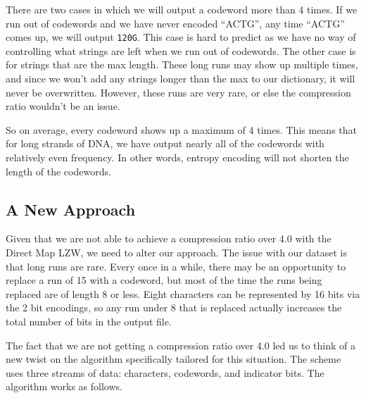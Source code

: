 \documentclass[12pt,twoside]{reedthesis}
\begin{document}
There are two cases in which we will output a codeword more than 4 times. If we run out of codewords and we have never encoded ``ACTG'', any time ``ACTG'' comes up, we will output \texttt{120G}. This case is hard to predict as we have no way of controlling what strings are left when we run out of codewords. The other case is for strings that are the max length. These long runs may show up multiple times, and since we won't add any strings longer than the max to our dictionary, it will never be overwritten. However, these runs are very rare, or else the compression ratio wouldn't be an issue.

So on average, every codeword shows up a maximum of 4 times. This means that for long strands of DNA, we have output nearly all of the codewords with relatively even frequency. In other words, entropy encoding will not shorten the length of the codewords.

\hypertarget{a-new-approach}{%
\subsection{A New Approach}\label{a-new-approach}}

Given that we are not able to achieve a compression ratio over 4.0 with the Direct Map LZW, we need to alter our approach. The issue with our dataset is that long runs are rare. Every once in a while, there may be an opportunity to replace a run of 15 with a codeword, but most of the time the runs being replaced are of length 8 or less. Eight characters can be represented by 16 bits via the 2 bit encodings, so any run under 8 that is replaced actually increases the total number of bits in the output file.

The fact that we are not getting a compression ratio over 4.0 led us to think of a new twist on the algorithm specifically tailored for this situation. The scheme uses three streams of data: characters, codewords, and indicator bits. The algorithm works as follows.
\end{document}
